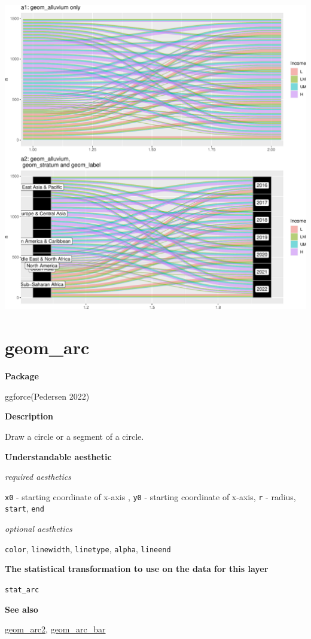 \documentclass[
  letterpaper,
  DIV=11,
  numbers=noendperiod]{scrreprt}
\begin{document}
\includegraphics{a_files/figure-pdf/alluvial-1.pdf}

\section{geom\_arc}\label{geom_arc}

\textbf{Package}

ggforce(Pedersen 2022)

\textbf{Description}

Draw a circle or a segment of a circle.

\textbf{Understandable aesthetic}

\emph{required aesthetics}

\texttt{x0} - starting coordinate of x-axis , \texttt{y0} - starting
coordinate of x-axis, \texttt{r} - radius, \texttt{start}, \texttt{end}

\emph{optional aesthetics}

\texttt{color}, \texttt{linewidth}, \texttt{linetype}, \texttt{alpha},
\texttt{lineend}

\textbf{The statistical transformation to use on the data for this
layer}

\texttt{stat\_arc}

\textbf{See also}

\hyperref[arc2]{geom\_arc2}, \hyperref[arcbar]{geom\_arc\_bar}
\end{document}
